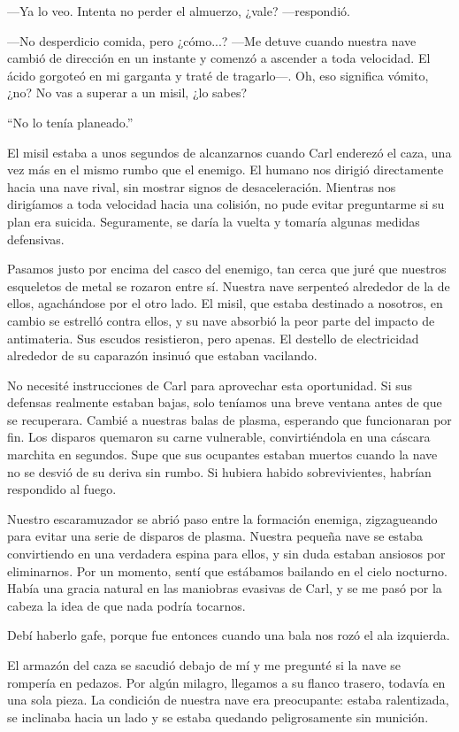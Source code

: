 —Ya lo veo. Intenta no perder el almuerzo, ¿vale? —respondió.

—No desperdicio comida, pero ¿cómo...? —Me detuve cuando nuestra nave cambió de dirección en un instante y comenzó a ascender a toda velocidad. El ácido gorgoteó en mi garganta y traté de tragarlo—. Oh, eso significa vómito, ¿no? No vas a superar a un misil, ¿lo sabes?

``No lo tenía planeado.''


El misil estaba a unos segundos de alcanzarnos cuando Carl enderezó el caza, una vez más en el mismo rumbo que el enemigo. El humano nos dirigió directamente hacia una nave rival, sin mostrar signos de desaceleración. Mientras nos dirigíamos a toda velocidad hacia una colisión, no pude evitar preguntarme si su plan era suicida. Seguramente, se daría la vuelta y tomaría algunas medidas defensivas.

Pasamos justo por encima del casco del enemigo, tan cerca que juré que nuestros esqueletos de metal se rozaron entre sí. Nuestra nave serpenteó alrededor de la de ellos, agachándose por el otro lado. El misil, que estaba destinado a nosotros, en cambio se estrelló contra ellos, y su nave absorbió la peor parte del impacto de antimateria. Sus escudos resistieron, pero apenas. El destello de electricidad alrededor de su caparazón insinuó que estaban vacilando.

No necesité instrucciones de Carl para aprovechar esta oportunidad. Si sus defensas realmente estaban bajas, solo teníamos una breve ventana antes de que se recuperara. Cambié a nuestras balas de plasma, esperando que funcionaran por fin. Los disparos quemaron su carne vulnerable, convirtiéndola en una cáscara marchita en segundos. Supe que sus ocupantes estaban muertos cuando la nave no se desvió de su deriva sin rumbo. Si hubiera habido sobrevivientes, habrían respondido al fuego.

Nuestro escaramuzador se abrió paso entre la formación enemiga, zigzagueando para evitar una serie de disparos de plasma. Nuestra pequeña nave se estaba convirtiendo en una verdadera espina para ellos, y sin duda estaban ansiosos por eliminarnos. Por un momento, sentí que estábamos bailando en el cielo nocturno. Había una gracia natural en las maniobras evasivas de Carl, y se me pasó por la cabeza la idea de que nada podría tocarnos.

Debí haberlo gafe, porque fue entonces cuando una bala nos rozó el ala izquierda.

El armazón del caza se sacudió debajo de mí y me pregunté si la nave se rompería en pedazos. Por algún milagro, llegamos a su flanco trasero, todavía en una sola pieza. La condición de nuestra nave era preocupante: estaba ralentizada, se inclinaba hacia un lado y se estaba quedando peligrosamente sin munición.

